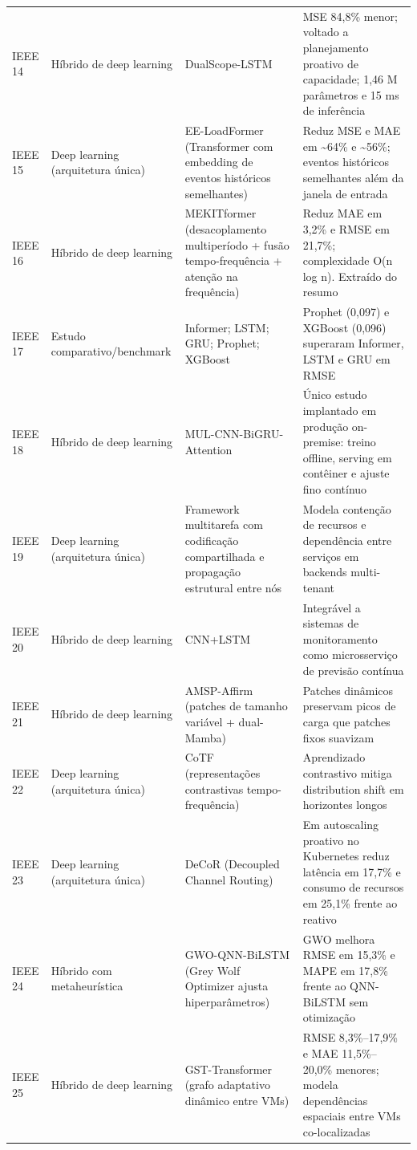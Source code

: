{\begin{longtable}{p{1.3cm}p{2.6cm}p{5.0cm}p{5.9cm}}
IEEE 14 & Híbrido de deep learning & DualScope-LSTM & MSE 84,8\% menor; voltado a planejamento proativo de capacidade; 1,46 M parâmetros e 15 ms de inferência \\
IEEE 15 & Deep learning (arquitetura única) & EE-LoadFormer (Transformer com embedding de eventos históricos semelhantes) & Reduz MSE e MAE em \textasciitilde{}64\% e \textasciitilde{}56\%; eventos históricos semelhantes além da janela de entrada \\
IEEE 16 & Híbrido de deep learning & MEKITformer (desacoplamento multiperíodo + fusão tempo-frequência + atenção na frequência) & Reduz MAE em 3,2\% e RMSE em 21,7\%; complexidade O(n log n). Extraído do resumo \\
IEEE 17 & Estudo comparativo/benchmark & Informer; LSTM; GRU; Prophet; XGBoost & Prophet (0,097) e XGBoost (0,096) superaram Informer, LSTM e GRU em RMSE \\
IEEE 18 & Híbrido de deep learning & MUL-CNN-BiGRU-Attention & Único estudo implantado em produção on-premise: treino offline, serving em contêiner e ajuste fino contínuo \\
IEEE 19 & Deep learning (arquitetura única) & Framework multitarefa com codificação compartilhada e propagação estrutural entre nós & Modela contenção de recursos e dependência entre serviços em backends multi-tenant \\
IEEE 20 & Híbrido de deep learning & CNN+LSTM & Integrável a sistemas de monitoramento como microsserviço de previsão contínua \\
IEEE 21 & Híbrido de deep learning & AMSP-Affirm (patches de tamanho variável + dual-Mamba) & Patches dinâmicos preservam picos de carga que patches fixos suavizam \\
IEEE 22 & Deep learning (arquitetura única) & CoTF (representações contrastivas tempo-frequência) & Aprendizado contrastivo mitiga distribution shift em horizontes longos \\
IEEE 23 & Deep learning (arquitetura única) & DeCoR (Decoupled Channel Routing) & Em autoscaling proativo no Kubernetes reduz latência em 17,7\% e consumo de recursos em 25,1\% frente ao reativo \\
IEEE 24 & Híbrido com metaheurística & GWO-QNN-BiLSTM (Grey Wolf Optimizer ajusta hiperparâmetros) & GWO melhora RMSE em 15,3\% e MAPE em 17,8\% frente ao QNN-BiLSTM sem otimização \\
IEEE 25 & Híbrido de deep learning & GST-Transformer (grafo adaptativo dinâmico entre VMs) & RMSE 8,3\%–17,9\% e MAE 11,5\%–20,0\% menores; modela dependências espaciais entre VMs co-localizadas \\

\end{longtable}}
